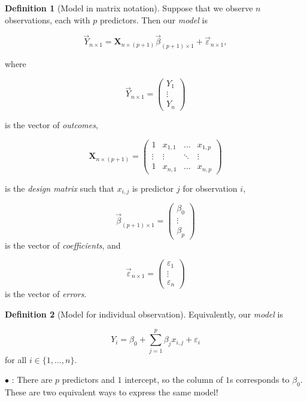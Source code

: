 \documentclass[12pt,oneside]{article}
\newcommand{\tip}{\textbf{\faLightbulb}: }
\theoremstyle{definition}
\newtheorem{definition}{Definition}
\theoremstyle{remark}
\begin{document}
\begin{definition}[Model in matrix notation]
Suppose that we observe $n$ observations, each with $p$ predictors. Then our \textit{model} is

\[\vec{Y}_{n \times 1} = \boldsymbol{X}_{n \times (p + 1)} \vec{\beta}_{(p + 1) \times 1} + \vec{\varepsilon}_{n \times 1},\]

where

\[\vec{Y}_{n \times 1} =
\begin{pmatrix}
Y_1 \\
\vdots \\
Y_n
\end{pmatrix}\] 

is the vector of \textit{outcomes},

\[\boldsymbol{X}_{n \times (p + 1)} = 
\begin{pmatrix}
1 & x_{1, 1} & \ldots & x_{1, p} \\
\vdots & \vdots & \ddots & \vdots \\
1 & x_{n, 1} & \ldots & x_{n, p}
\end{pmatrix}\]

is the \textit{design matrix} such that $x_{i, j}$ is predictor $j$ for observation $i$, 

\[\vec{\beta}_{(p + 1) \times 1} =
\begin{pmatrix}
\beta_0 \\
\vdots \\
\beta_p
\end{pmatrix}\] is the vector of \textit{coefficients}, and

\[\vec{\varepsilon}_{n \times 1} =
\begin{pmatrix}
\varepsilon_1 \\
\vdots \\
\varepsilon_n
\end{pmatrix}\] is the vector of \textit{errors}.
\end{definition}

\begin{definition}[Model for individual observation]
Equivalently, our \textit{model} is

\[Y_i = \beta_0 + \sum_{j = 1}^{p} \beta_j x_{i, j} + \varepsilon_i\] for all $i \in \{1, \ldots, n\}$.

$\bullet$ \tip There are $p$ predictors and $1$ intercept, so the column of $1$s corresponds to $\beta_0$. These are two equivalent ways to express the same model!
\end{definition}
\end{document}
